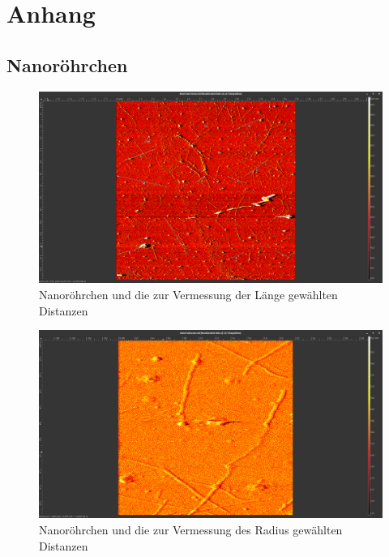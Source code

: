 

\chapter{Anhang}
\label{chap:anhangA}
\section{Nanoröhrchen}
\begin{figure}[h]
    \centering
    \includegraphics[width = \linewidth]{Bilder/Nanotubes/NanoTube15umLaenge2.png}
    \caption{Nanoröhrchen und die zur Vermessung der Länge gewählten Distanzen}
    \label{Nanotube20Mess}
\end{figure}

\begin{figure}[h]
    \centering
    \includegraphics[width = \linewidth]{Bilder/Nanotubes/NanotubesBreiteHoehe2.png}
    \caption{Nanoröhrchen und die zur Vermessung des Radius gewählten Distanzen}
    \label{NanoRadius}
\end{figure}


